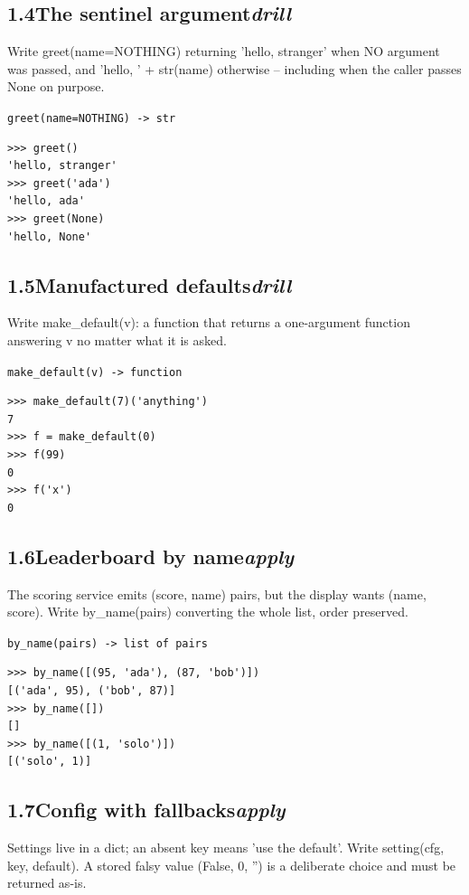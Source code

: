 \documentclass[10pt,letterpaper]{book}
\begin{document}
\subsection*{1.4\quad The sentinel argument\hfill\textnormal{\textit{drill}}}
Write greet(name=NOTHING) returning 'hello, stranger' when NO argument was passed, and 'hello, ' + str(name) otherwise -- including when the caller passes None on purpose.

\noindent\texttt{greet(name=NOTHING) -> str}
\begin{lstlisting}[style=ex]
>>> greet()
'hello, stranger'
>>> greet('ada')
'hello, ada'
>>> greet(None)
'hello, None'
\end{lstlisting}
\subsection*{1.5\quad Manufactured defaults\hfill\textnormal{\textit{drill}}}
Write make\_default(v): a function that returns a one-argument function answering v no matter what it is asked.

\noindent\texttt{make\_default(v) -> function}
\begin{lstlisting}[style=ex]
>>> make_default(7)('anything')
7
>>> f = make_default(0)
>>> f(99)
0
>>> f('x')
0
\end{lstlisting}

\subsection*{1.6\quad Leaderboard by name\hfill\textnormal{\textit{apply}}}
The scoring service emits (score, name) pairs, but the display wants (name, score). Write by\_name(pairs) converting the whole list, order preserved.

\noindent\texttt{by\_name(pairs) -> list of pairs}
\begin{lstlisting}[style=ex]
>>> by_name([(95, 'ada'), (87, 'bob')])
[('ada', 95), ('bob', 87)]
>>> by_name([])
[]
>>> by_name([(1, 'solo')])
[('solo', 1)]
\end{lstlisting}
\subsection*{1.7\quad Config with fallbacks\hfill\textnormal{\textit{apply}}}
Settings live in a dict; an absent key means 'use the default'. Write setting(cfg, key, default). A stored falsy value (False, 0, '') is a deliberate choice and must be returned as-is.
\end{document}
